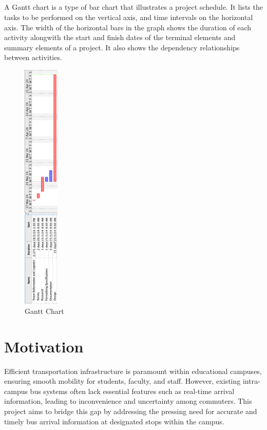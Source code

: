\documentclass[12pt]{article} %
\begin{document}
\clearpage

\subsection{}
A Gantt chart is a type of bar chart that illustrates a project schedule. It lists the tasks to be performed on the vertical axis, and time intervals on the horizontal axis. The width of the horizontal bars in the graph shows the duration of each activity alongwith the start and finish dates of the terminal elements and summary elements of a project. It also shows the dependency relationships between activities.

\begin{figure}[H]
    \centering
    \includegraphics[width=0.15\textwidth]{gantt1.png}
    \caption{Gantt Chart}
    \label{fig:enter-label}
\end{figure}

\clearpage

    \section{Motivation}

Efficient transportation infrastructure is paramount within educational campuses, ensuring smooth mobility for students, faculty, and staff. However, existing intra-campus bus systems often lack essential features such as real-time arrival information\cite{gogri_real_nodate}, leading to inconvenience and uncertainty among commuters. This project aims to bridge this gap by addressing the pressing need for accurate and timely bus arrival information at designated stops within the campus.
\end{document}
